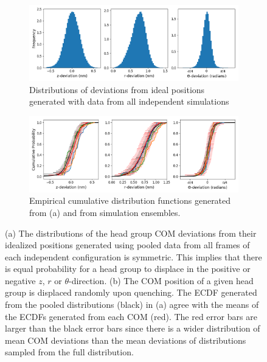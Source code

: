 \documentclass[journal=jpcbfk,manuscript=article]{achemso}
\begin{document}
  \begin{figure}[!htb]
  \centering
  \begin{subfigure}{\textwidth}
  \includegraphics[width=\textwidth]{offset_ensemble_pooled.png}
  \caption{Distributions of deviations from ideal positions generated with data
  from all independent simulations}\label{fig:offset_ensemble_pooled}
  \end{subfigure}
  \begin{subfigure}{\textwidth}
  \includegraphics[width=\textwidth]{offset_ecdfs.png}
  \caption{Empirical cumulative distribution functions generated from (a) and
  from simulation ensembles.}\label{fig:offset_ecdfs}
  \end{subfigure}
  \caption{(a) The distributions of the head group COM deviations
  from their idealized positions generated using pooled data from all
  frames of each independent configuration is symmetric. This implies that 
  there is equal probability for a head group to displace in the positive
  or negative $z$, $r$ or $\theta$-direction. (b) The COM position of a 
  given head group is displaced randomly upon quenching. The ECDF generated from
  the pooled distributions (black) in (a) agree with the means of the 
  ECDFs generated from each COM (red). The red error bars are larger than
  the black error bars since there is a wider distribution of mean COM
  deviations than the mean deviations of distributions sampled from the full
  distribution.}\label{fig:full_ensemble_distributions}
  \end{figure}
  
\end{document}
